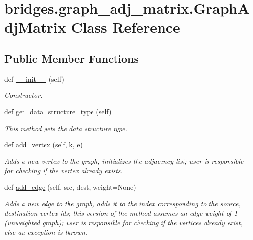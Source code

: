 \hypertarget{classbridges_1_1graph__adj__matrix_1_1_graph_adj_matrix}{}\section{bridges.\+graph\+\_\+adj\+\_\+matrix.\+Graph\+Adj\+Matrix Class Reference}
\label{classbridges_1_1graph__adj__matrix_1_1_graph_adj_matrix}
\subsection*{Public Member Functions}
\begin{DoxyCompactItemize}
\item 
def \hyperlink{classbridges_1_1graph__adj__matrix_1_1_graph_adj_matrix_a77b2efa6f296054ada425ee61e0d22a8}{\+\_\+\+\_\+init\+\_\+\+\_\+} (self)
\begin{DoxyCompactList}\small\item\em Constructor. \end{DoxyCompactList}\item 
def \hyperlink{classbridges_1_1graph__adj__matrix_1_1_graph_adj_matrix_a54eb655222dcff0a569728b150e493b7}{get\+\_\+data\+\_\+structure\+\_\+type} (self)
\begin{DoxyCompactList}\small\item\em This method gets the data structure type. \end{DoxyCompactList}\item 
def \hyperlink{classbridges_1_1graph__adj__matrix_1_1_graph_adj_matrix_aa6fa31ebae643950dd33628269136d00}{add\+\_\+vertex} (self, k, e)
\begin{DoxyCompactList}\small\item\em Adds a new vertex to the graph, initializes the adjacency list; user is responsible for checking if the vertex already exists. \end{DoxyCompactList}\item 
def \hyperlink{classbridges_1_1graph__adj__matrix_1_1_graph_adj_matrix_aad67dc7b3da58ff67fd807a3455765c1}{add\+\_\+edge} (self, src, dest, weight=None)
\begin{DoxyCompactList}\small\item\em Adds a new edge to the graph, adds it to the index corresponding to the source, destination vertex ids; this version of the method assumes an edge weight of 1 (unweighted graph); user is responsible for checking if the vertices already exist, else an exception is thrown. \end{DoxyCompactList}\item 

\end{DoxyCompactItemize}
